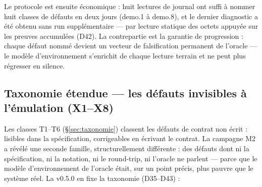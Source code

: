Le protocole est ensuite économique : huit lectures de journal ont suffi à nommer huit
classes de défauts en deux jours (demo.1 à demo.8), et le dernier diagnostic a été obtenu
sans run supplémentaire — par lecture statique des octets appuyée sur les preuves
accumulées (D42). La contrepartie est la garantie de progression : chaque défaut nommé
devient un vecteur de falsification permanent de l'oracle — le modèle d'environnement
s'enrichit de chaque lecture terrain et ne peut plus régresser en silence.

\subsection{Taxonomie étendue — les défauts invisibles à l'émulation (X1--X8)}\label{sec:taxonomieX}

Les classes T1--T6 (§\ref{sec:taxonomie}) classent les défauts de contrat non écrit :
lisibles dans la spécification, corrigeables en écrivant le contrat. La campagne M2 a
révélé une seconde famille, structurellement différente : des défauts dont ni la
spécification, ni la notation, ni le round-trip, ni l'oracle ne parlent — parce que le
modèle d'environnement de l'oracle était, sur un point précis, plus pauvre que le système
réel. La v0.5.0 en fixe la taxonomie (D35--D43) :

